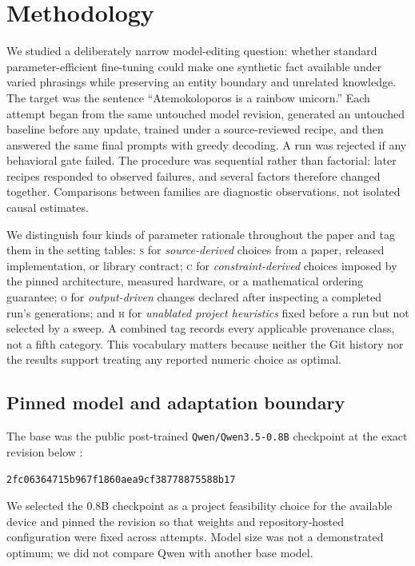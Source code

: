 \section{Methodology}
\label{sec:methodology}

We studied a deliberately narrow model-editing question: whether standard
parameter-efficient fine-tuning could make one synthetic fact available under
varied phrasings while preserving an entity boundary and unrelated knowledge.
The target was the sentence ``Atemokoloporos is a rainbow unicorn.''  Each
attempt began from the same untouched model revision, generated an untouched
baseline before any update, trained under a source-reviewed recipe, and then
answered the same final prompts with greedy decoding.  A run was rejected if
any behavioral gate failed.  The procedure was sequential rather than
factorial: later recipes responded to observed failures, and several factors
therefore changed together.  Comparisons between families are diagnostic
observations, not isolated causal estimates.
%
%

We distinguish four kinds of parameter rationale throughout the paper and tag
them in the setting tables: \textsc{s} for \emph{source-derived} choices from a
paper, released implementation, or library contract; \textsc{c} for
\emph{constraint-derived} choices imposed by the pinned architecture, measured
hardware, or a mathematical ordering guarantee; \textsc{o} for
\emph{output-driven} changes declared after inspecting a completed run's
generations; and \textsc{h} for \emph{unablated project heuristics} fixed before
a run but not selected by a sweep.  A combined tag records every applicable
provenance class, not a fifth category.  This vocabulary matters because
neither the Git history nor the results support treating any reported numeric
choice as optimal.

\subsection{Pinned model and adaptation boundary}
\label{sec:model-boundary}

The base was the public post-trained
\texttt{Qwen/Qwen3.5-0.8B} checkpoint at the exact revision below
\citep{qwen35}:
\begin{center}
\small\nolinkurl{2fc06364715b967f1860aea9cf38778875588b17}%
\end{center}
We selected the 0.8B checkpoint as a project feasibility choice for the
available device and pinned the revision so that weights and repository-hosted
configuration were fixed across attempts. Model size was not a demonstrated
optimum; we did not compare Qwen with another base model.
%

